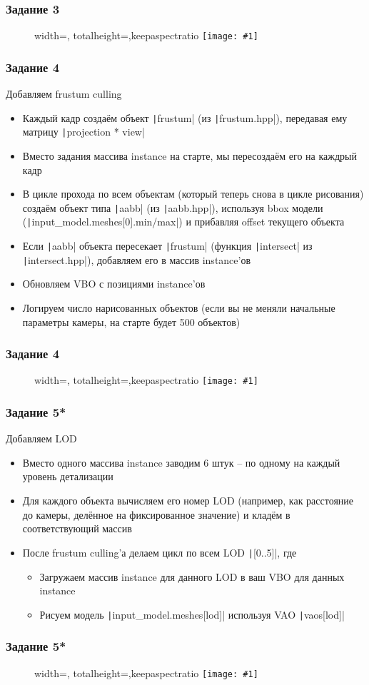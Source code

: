 \documentclass{beamer}
\newcommand{\slideimage}[1]{
  \begin{figure}
    \begin{adjustbox}{width=\textwidth, totalheight=\textheight-2\baselineskip-2\baselineskip,keepaspectratio}
      \texttt{[image: \#1]}
    \end{adjustbox}
  \end{figure}
}
\begin{document}
\begin{frame}
\frametitle{Задание 3}
\slideimage{2.png}
\end{frame}

\begin{frame}[fragile]
\fontsize{10pt}{10pt}
\frametitle{Задание 4}
Добавляем frustum culling
\begin{itemize}
\item Каждый кадр создаём объект \texttt|frustum| (из \texttt|frustum.hpp|), передавая ему матрицу \texttt|projection * view|
\item Вместо задания массива instance на старте, мы пересоздаём его на каждрый кадр
\item В цикле прохода по всем объектам (который теперь снова в цикле рисования) создаём объект типа \texttt|aabb| (из \texttt|aabb.hpp|), используя bbox модели (\texttt|input_model.meshes[0].min/max|) и прибавляя offset текущего объекта
\item Если \texttt|aabb| объекта пересекает \texttt|frustum| (функция \texttt|intersect| из \texttt|intersect.hpp|), добавляем его в массив instance'ов
\item Обновляем VBO с позициями instance'ов
\item Логируем число нарисованных объектов (если вы не меняли начальные параметры камеры, на старте будет 500 объектов)
\end{itemize}
\end{frame}

\begin{frame}
\frametitle{Задание 4}
\slideimage{2.png}
\end{frame}

\begin{frame}[fragile]
\fontsize{10pt}{10pt}
\frametitle{Задание 5*}
Добавляем LOD
\begin{itemize}
\item Вместо одного массива instance заводим 6 штук -- по одному на каждый уровень детализации
\item Для каждого объекта вычисляем его номер LOD (например, как расстояние до камеры, делённое на фиксированное значение) и кладём в соответствующий массив
\item После frustum culling'а делаем цикл по всем LOD \texttt|[0..5]|, где
\begin{itemize}
\item Загружаем массив instance для данного LOD в ваш VBO для данных instance
\item Рисуем модель \texttt|input_model.meshes[lod]| используя VAO \texttt|vaos[lod]|
\end{itemize}
\end{itemize}
\end{frame}

\begin{frame}
\frametitle{Задание 5*}
\slideimage{5.png}
\end{frame}
\end{document}
